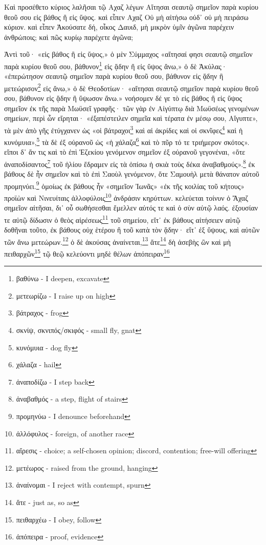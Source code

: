
Καὶ
προσέθετο
κύριος
λαλῆσαι
τῷ
Αχαζ
λέγων
Αἴτησαι
σεαυτῷ
σημεῖον
παρὰ
κυρίου
θεοῦ
σου
εἰς
βάθος
ἢ
εἰς
ὕψος.
καὶ
εἶπεν
Αχαζ
Οὐ
μὴ
αἰτήσω
οὐδ᾽
οὐ
μὴ
πειράσω
κύριον.
καὶ
εἶπεν
Ἀκούσατε
δή,
οἶκος
Δαυιδ,
μὴ
μικρὸν
ὑμῖν
ἀγῶνα
παρέχειν
ἀνθρώποις;
καὶ
πῶς
κυρίῳ
παρέχετε
ἀγῶνα;  


Ἀντὶ
τοῦ·
«εἰς
βάθος
ἢ
εἰς
ὕψος,»
ὁ
μὲν
Σύμμαχος
«αἴτησαί
φησι
σεαυτῷ
σημεῖον
παρὰ
κυρίου
θεοῦ
σου,
βάθυνον\footnote{βαθύνω - I deepen, excavate}
εἰς
ᾅδην
ἢ
εἰς
ὕψος
ἄνω,»
ὁ
δὲ
Ἀκύλας·
«ἐπερώτησον
σεαυτῷ
σημεῖον
παρὰ
κυρίου
θεοῦ
σου,
βάθυνον
εἰς
ᾅδην
ἢ
μετεώρισον\footnote{μετεωρίζω - I raise up on high}
εἰς
ἄνω,»
ὁ
δὲ
Θεοδοτίων·
«αἴτησαι
σεαυτῷ
σημεῖον
παρὰ
κυρίου
θεοῦ
σου,
βάθυνον
εἰς
ᾅδην
ἢ
ὕψωσον
ἄνω.»
νοήσομεν
δέ
γε
τὸ
εἰς
βάθος
ἢ
εἰς
ὕψος
σημεῖον
ἐκ
τῆς
παρὰ
Μωϋσεῖ
γραφῆς·
τῶν
γὰρ
ἐν
Αἰγύπτῳ
διὰ
Μωϋσέως
γενομένων
σημείων,
περὶ
ὧν
εἴρηται·
«ἐξαπέστειλεν
σημεῖα
καὶ
τέρατα
ἐν
μέσῳ
σου,
Αἴγυπτε»,
τὰ
μὲν
ἀπὸ
γῆς
ἐτύγχανεν
ὡς
«οἱ
βάτραχοι\footnote{βάτραχος - frog}
καὶ
αἱ
ἀκρίδες
καὶ
οἱ
σκνῖφες\footnote{σκνίψ, σκνιπός/σκιφός - small fly, gnat}
καὶ
ἡ
κυνόμυια»,\footnote{κυνόμυια - dog fly}
τὰ
δὲ
ἐξ
οὐρανοῦ
ὡς
«ἡ
χάλαζα\footnote{χάλαζα - hail}
καὶ
τὸ
πῦρ
τό
τε
τριήμερον
σκότος».
εἴποι
δ᾽
ἄν
τις
καὶ
τὸ
ἐπὶ
Ἑζεκίου
γενόμενον
σημεῖον
ἐξ
οὐρανοῦ
γεγονέναι,
«ὅτε
ἀναποδίσαντος\footnote{ἀναποδίζω - I step back}
τοῦ
ἡλίου
ἔδραμεν
εἰς
τὰ
ὀπίσω
ἡ
σκιὰ
τοὺς
δέκα
ἀναβαθμούς».\footnote{ἀναβαθμός - a step, flight of stairs}
ἐκ
βάθους
δὲ
ἦν
σημεῖον
καὶ
τὸ
ἐπὶ
Σαοὺλ
γενόμενον,
ὅτε
Σαμουὴλ
μετὰ
θάνατον
αὐτοῦ
προμηνύει.\footnote{προμηνύω - I denounce beforehand}
ὁμοίως
ἐκ
βάθους
ἦν
«σημεῖον
Ἰωνᾶς»
«ἐκ
τῆς
κοιλίας
τοῦ
κήτους»
προϊὼν
καὶ
Νινευίταις
ἀλλοφύλοις\footnote{ἀλλόφυλος - foreign, of another race}
ἀνδράσιν
κηρύττων.
κελεύεται
τοίνυν
ὁ
Ἄχαζ
σημεῖον
αἰτῆσαι,
δι᾽
οὗ
σωθήσεσθαι
ἔμελλεν
αὐτός
τε
καὶ
ὁ
σὺν
αὐτῷ
λαός.
ἐξουσίαν
τε
αὐτῷ
δίδωσιν
ὁ
θεὸς
αἱρέσεως\footnote{αἵρεσις - choice; a self-chosen opinion; discord, contention; free-will offering}
τοῦ
σημείου,
εἴτ᾽
ἐκ
βάθους
αἰτήσειεν
αὐτῷ
δοθῆναι
τοῦτο,
ἐκ
βάθους
οὐχ
ἑτέρου
ἢ
τοῦ
κατὰ
τὸν
ᾅδην·
εἴτ᾽
ἐξ
ὕψους,
καὶ
αὐτῶν
τῶν
ἄνω
μετεώρων.\footnote{μετέωρος - raised from the ground, hanging}
ὁ
δὲ
ἀκούσας
ἀναίνεται,\footnote{ἀναίνομαι - I reject with contempt, spurn}
ἅτε\footnote{ἅτε - just as, so as}
δὴ
ἀσεβὴς
ὢν
καὶ
μὴ
πειθαρχῶν\footnote{πειθαρχέω - I obey, follow}
τῷ
θεῷ
κελεύοντι
μηδὲ
θέλων
ἀπόπειραν\footnote{ἀπόπειρα - proof, evidence}
